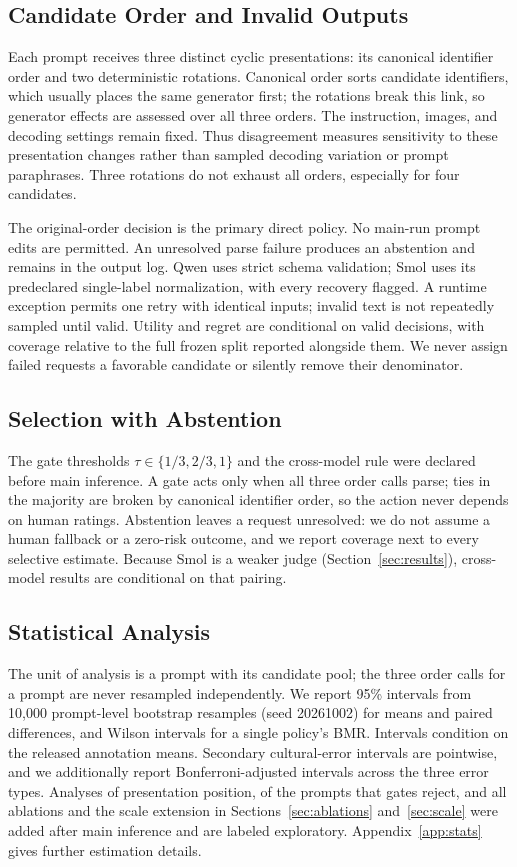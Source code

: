 \documentclass[letterpaper]{article}
\begin{document}
\subsection{Candidate Order and Invalid Outputs}
Each prompt receives three distinct cyclic presentations: its canonical identifier order and two deterministic rotations. Canonical order sorts candidate identifiers, which usually places the same generator first; the rotations break this link, so generator effects are assessed over all three orders. The instruction, images, and decoding settings remain fixed. Thus disagreement measures sensitivity to these presentation changes rather than sampled decoding variation or prompt paraphrases. Three rotations do not exhaust all orders, especially for four candidates.

The original-order decision is the primary direct policy. No main-run prompt edits are permitted. An unresolved parse failure produces an abstention and remains in the output log. Qwen uses strict schema validation; Smol uses its predeclared single-label normalization, with every recovery flagged. A runtime exception permits one retry with identical inputs; invalid text is not repeatedly sampled until valid. Utility and regret are conditional on valid decisions, with coverage relative to the full frozen split reported alongside them. We never assign failed requests a favorable candidate or silently remove their denominator.

\subsection{Selection with Abstention}
The gate thresholds $\tau\in\{1/3,2/3,1\}$ and the cross-model rule were declared before main inference. A gate acts only when all three order calls parse; ties in the majority are broken by canonical identifier order, so the action never depends on human ratings. Abstention leaves a request unresolved: we do not assume a human fallback or a zero-risk outcome, and we report coverage next to every selective estimate. Because Smol is a weaker judge (Section~\ref{sec:results}), cross-model results are conditional on that pairing.

\subsection{Statistical Analysis}
The unit of analysis is a prompt with its candidate pool; the three order calls for a prompt are never resampled independently. We report 95\% intervals from 10,000 prompt-level bootstrap resamples (seed 20261002) for means and paired differences, and Wilson intervals for a single policy's BMR. Intervals condition on the released annotation means. Secondary cultural-error intervals are pointwise, and we additionally report Bonferroni-adjusted intervals across the three error types. Analyses of presentation position, of the prompts that gates reject, and all ablations and the scale extension in Sections~\ref{sec:ablations} and~\ref{sec:scale} were added after main inference and are labeled exploratory. Appendix~\ref{app:stats} gives further estimation details.
\end{document}
